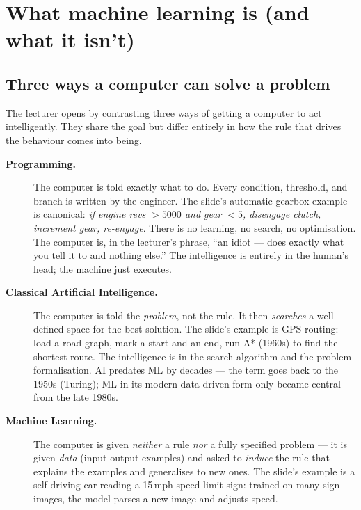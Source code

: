 \documentclass[11pt, a4paper]{article}
\begin{document}
\section{What machine learning is (and what it isn't)}

\subsection{Three ways a computer can solve a problem}

The lecturer opens by contrasting three ways of getting a computer to act intelligently. They share the goal but differ entirely in how the rule that drives the behaviour comes into being.

\begin{description}
  \item[\textbf{Programming.}] The computer is told exactly what to do. Every condition, threshold, and branch is written by the engineer. The slide's automatic-gearbox example is canonical: \emph{if engine revs $> 5000$ and gear $< 5$, disengage clutch, increment gear, re-engage}. There is no learning, no search, no optimisation. The computer is, in the lecturer's phrase, ``an idiot — does exactly what you tell it to and nothing else.'' The intelligence is entirely in the human's head; the machine just executes.

  \item[\textbf{Classical Artificial Intelligence.}] The computer is told the \emph{problem}, not the rule. It then \emph{searches} a well-defined space for the best solution. The slide's example is GPS routing: load a road graph, mark a start and an end, run A* (1960s) to find the shortest route. The intelligence is in the search algorithm and the problem formalisation. AI predates ML by decades — the term goes back to the 1950s (Turing); ML in its modern data-driven form only became central from the late 1980s.

  \item[\textbf{Machine Learning.}] The computer is given \emph{neither} a rule \emph{nor} a fully specified problem — it is given \emph{data} (input-output examples) and asked to \emph{induce} the rule that explains the examples and generalises to new ones. The slide's example is a self-driving car reading a 15\,mph speed-limit sign: trained on many sign images, the model parses a new image and adjusts speed.
\end{description}
\end{document}
